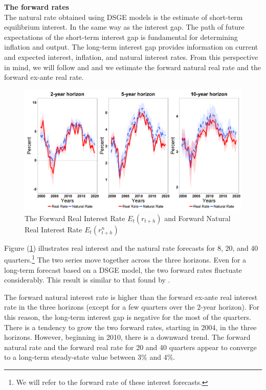 \documentclass[12pt,oneside,a4paper]{article}
\begin{document}
\textbf{The forward rates} \\

The natural rate obtained using DSGE models is the estimate of short-term equilibrium interest. In the same way as the interest gap. The path of future expectations of the short-term interest gap is fundamental for determining inflation and output. The long-term interest gap provides information on current and expected interest, inflation, and natural interest rates. From this perspective in mind, we will follow \citet{Justiniano:2010} and \citet{DelNegro:2017} and we estimate the forward natural real rate and the forward ex-ante real rate.

\begin{figure}[H]
\begin{center}
\caption{The Forward Real Interest Rate $E_t(r_{t+h})$ and
Forward Natural Real Interest Rate $E_t(r_{t+h}^{n})$}
\label{fig:Forward_rate}
\includegraphics[scale=0.52]{Capitulo_1/Juros_Forward.png}  
\end{center}
\end{figure}


Figure (\ref{fig:Forward_rate}) illustrates real interest and the natural rate forecasts for 8, 20, and 40 quarters.\footnote{We will refer to the forward rate of these interest forecasts.} The two series move together across the three horizons. Even for a long-term forecast based on a DSGE model, the two forward rates fluctuate considerably. This result is similar to that found by \citet{DelNegro:2017}. 

The forward natural interest rate is higher than the forward ex-ante real interest rate in the three horizons (except for a few quarters over the 2-year horizon). For this reason, the long-term interest gap is negative for the most of the quarters. There is a tendency to grow the two forward rates, starting in 2004, in the three horizons. However, beginning in 2010, there is a downward trend. The forward natural rate and the forward real rate for 20 and 40 quarters appear to converge to a long-term steady-state value between 3\% and 4\%.
\end{document}

